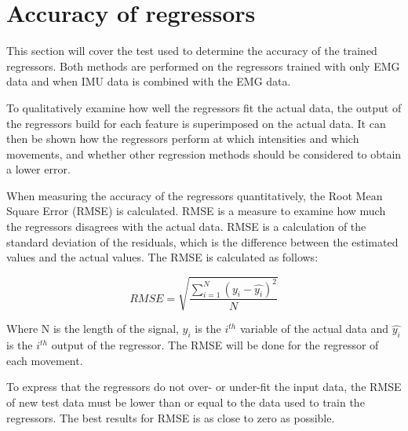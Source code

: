 \section{Accuracy of regressors}

This section will cover the test used to determine the accuracy of the trained regressors. Both methods are performed on the regressors trained with only EMG data and when IMU data is combined with the EMG data. 

To qualitatively examine how well the regressors fit the actual data, the output of the regressors build for each feature is superimposed on the actual data. It can then be shown how the regressors perform at which intensities and which movements, and whether other regression methods should be considered to obtain a lower error.

When measuring the accuracy of the regressors quantitatively, the Root Mean Square Error (RMSE) is calculated. RMSE is a measure to examine how much the regressors disagrees with the actual data. RMSE is a calculation of the standard deviation of the residuals, which is the difference between the estimated values and the actual values. The RMSE is calculated as follows:

\begin{equation}
RMSE = \sqrt{\frac{\sum\limits_{i=1}^N(y_i - \hat{y_i})^2}{N}}
\end{equation}

Where N is the length of the signal, $y_i$ is the $i^{th}$ variable of the actual data and $\hat{y_i}$ is the $i^{th}$ output of the regressor. The RMSE will be done for the regressor of each movement.

To express that the regressors do not over- or under-fit the input data, the RMSE of new test data must be lower than or equal to the data used to train the regressors. The best results for RMSE is as close to zero as possible. 

